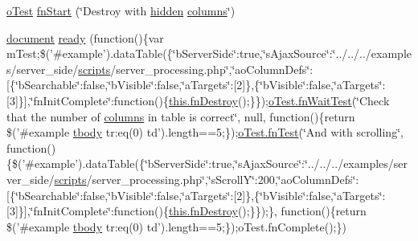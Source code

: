 \begin{DoxyCompactItemize}
\item 
\hyperlink{unit__test_8js_a3b2d259e2df3b6860d9047a92d09d0d6}{o\+Test} \hyperlink{4__server-side_22569_8js_a515e4990e5f95a3f3133de55e7f21d7f}{fn\+Start} (\char`\"{}Destroy with \hyperlink{media_2js_2jquery_8js_a6d83a3278d86577a50e8a86937570a90}{hidden} \hyperlink{model_8defaults_8columns_8js_af310571d7a4fac04bd949bdefb852a47}{columns}\char`\"{})
\item 
\hyperlink{outside_events_8js_aa14f8e0338cced6720590fd2ea13bd4b}{document} \hyperlink{4__server-side_22569_8js_a3e5be34431d61f009f27e982aaab1f44}{ready} (function()\{var m\+Test;\$('\#example').data\+Table(\{\char`\"{}b\+Server\+Side\char`\"{}\+:true,\char`\"{}s\+Ajax\+Source\char`\"{}\+:\char`\"{}../../../examples/server\+\_\+side/\hyperlink{tinymce_8jquery_8dev_8js_a09066d4d580eeec222f858d588b4cdef}{scripts}/server\+\_\+processing.\+php\char`\"{},\char`\"{}ao\+Column\+Defs\char`\"{}\+:\mbox{[}\{\char`\"{}b\+Searchable\char`\"{}\+:false,\char`\"{}b\+Visible\char`\"{}\+:false,\char`\"{}a\+Targets\char`\"{}\+:\mbox{[}2\mbox{]}\},\{\char`\"{}b\+Visible\char`\"{}\+:false,\char`\"{}a\+Targets\char`\"{}\+:\mbox{[}3\mbox{]}\}\mbox{]},\char`\"{}fn\+Init\+Complete\char`\"{}\+:function()\{\hyperlink{api_8methods_8js_ac4eaeaebd8fb562f32bcb4bc6803b55d}{this.\+fn\+Destroy}();\}\});\hyperlink{onhold_24__server-side_2__zero__config_8js_ab25c4d596771c0133cdc45178ce72c3d}{o\+Test.\+fn\+Wait\+Test}(\char`\"{}Check that the number of \hyperlink{model_8defaults_8columns_8js_af310571d7a4fac04bd949bdefb852a47}{columns} in table is correct\char`\"{}, null, function()\{return \$('\#example \hyperlink{core_8constructor_8js_a99b0542c7c50fe8757c55bf9dac5f3be}{tbody} tr\+:eq(0) td').length==5;\});\hyperlink{__zero__config__objects__subarrays_8js_a7f100cfe8617a03cd30c47b5e15396a4}{o\+Test.\+fn\+Test}(\char`\"{}And with scrolling\char`\"{}, function()\{\$('\#example').data\+Table(\{\char`\"{}b\+Server\+Side\char`\"{}\+:true,\char`\"{}s\+Ajax\+Source\char`\"{}\+:\char`\"{}../../../examples/server\+\_\+side/\hyperlink{tinymce_8jquery_8dev_8js_a09066d4d580eeec222f858d588b4cdef}{scripts}/server\+\_\+processing.\+php\char`\"{},\char`\"{}s\+Scroll\+Y\char`\"{}\+:200,\char`\"{}ao\+Column\+Defs\char`\"{}\+:\mbox{[}\{\char`\"{}b\+Searchable\char`\"{}\+:false,\char`\"{}b\+Visible\char`\"{}\+:false,\char`\"{}a\+Targets\char`\"{}\+:\mbox{[}2\mbox{]}\},\{\char`\"{}b\+Visible\char`\"{}\+:false,\char`\"{}a\+Targets\char`\"{}\+:\mbox{[}3\mbox{]}\}\mbox{]},\char`\"{}fn\+Init\+Complete\char`\"{}\+:function()\{\hyperlink{api_8methods_8js_ac4eaeaebd8fb562f32bcb4bc6803b55d}{this.\+fn\+Destroy}();\}\});\}, function()\{return \$('\#example \hyperlink{core_8constructor_8js_a99b0542c7c50fe8757c55bf9dac5f3be}{tbody} tr\+:eq(0) td').length==5;\});o\+Test.\+fn\+Complete();\})
\end{DoxyCompactItemize}


